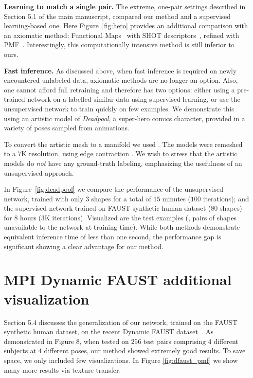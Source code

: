 \documentclass[10pt,twocolumn,letterpaper]{article}
\newcommand\comment[1]{{}}
\begin{document}
\begin{appendices}
\vspace{1ex}\noindent\textbf{Learning to match a single pair.}%
The extreme, one-pair settings described in Section {\color{red}5.1} of the main manuscript, compared our method and a supervised learning-based one. Here Figure~\ref{fig:hero} provides an additional comparison with an axiomatic method: Functional Maps~\cite{ovsjanikov12} with SHOT descriptors~\cite{SHOT}, refined with PMF~\cite{vestnerefficient}. Interestingly, this computationally intensive method is still inferior to ours. 

\vspace{1ex}\noindent\textbf{Fast inference.}%
As discussed above, when fast inference is required on newly encountered unlabeled data, \comment{and only a few input shapes are given}axiomatic methods are no longer an option. Also, one cannot afford full retraining and therefore has two options: either using a pre-trained network on a labelled similar data using supervised learning, or use the unsupervised network to train quickly on few examples. We demonstrate this using an artistic model of {\em Deadpool}, a super-hero comics character, provided in a variety of poses sampled from animations. 


To convert the artistic mesh to a manifold we used \cite{huang2018robust}. The models were remeshed to a $7$K resolution, using edge contraction \cite{garland1997surface}. We wish to stress that the artistic models do {\em not} have any ground-truth labeling, emphasizing the usefulness of an unsupervised approach.


In Figure~\ref{fig:deadpool} we compare the performance of the unsupervised network, trained with only $3$ shapes for a total of $15$ minutes ($100$ iterations); and the supervised network trained on FAUST synthetic human dataset ($80$ shapes) for $8$ hours ($3$K iterations). Visualized are the test examples (\ie, pairs of shapes unavailable to the network at training time). While both methods demonstrate equivalent inference time of less than one second, the performance gap is significant showing a clear advantage for our method. 

\section{MPI Dynamic FAUST additional visualization}\label{app:DFAUST}
Section 5.4 discusses the generalization of our network, trained on the FAUST synthetic human dataset, on the recent Dynamic FAUST dataset~\cite{dfaust:CVPR:2017}. As demonstrated in Figure $8$, when tested on $256$ test pairs comprising $4$ different subjects at $4$ different poses, our method showed extremely good results. To save space, we only included few visualizations. In Figure \ref{fig:dfaust_pmf} we show many more results via texture transfer.  
\end{appendices}

{\small


}
\end{document}
